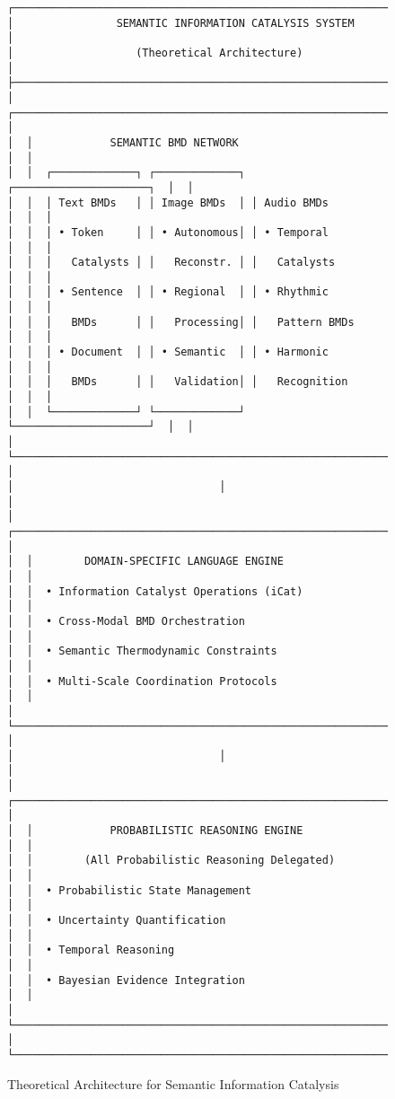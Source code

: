 \documentclass[12pt,a4paper,twoside]{article}
\begin{document}
\begin{figure}[h]
\centering
\begin{verbatim}
┌─────────────────────────────────────────────────────────────────┐
│                SEMANTIC INFORMATION CATALYSIS SYSTEM           │
│                   (Theoretical Architecture)                   │
├─────────────────────────────────────────────────────────────────┤
│  ┌───────────────────────────────────────────────────────────┐  │
│  │            SEMANTIC BMD NETWORK                           │  │
│  │  ┌─────────────┐ ┌─────────────┐ ┌─────────────────────┐  │  │
│  │  │ Text BMDs   │ │ Image BMDs  │ │ Audio BMDs          │  │  │
│  │  │ • Token     │ │ • Autonomous│ │ • Temporal          │  │  │
│  │  │   Catalysts │ │   Reconstr. │ │   Catalysts         │  │  │
│  │  │ • Sentence  │ │ • Regional  │ │ • Rhythmic          │  │  │
│  │  │   BMDs      │ │   Processing│ │   Pattern BMDs      │  │  │
│  │  │ • Document  │ │ • Semantic  │ │ • Harmonic          │  │  │
│  │  │   BMDs      │ │   Validation│ │   Recognition       │  │  │
│  │  └─────────────┘ └─────────────┘ └─────────────────────┘  │  │
│  └───────────────────────────────────────────────────────────┘  │
│                                │                                │
│  ┌───────────────────────────────────────────────────────────┐  │
│  │        DOMAIN-SPECIFIC LANGUAGE ENGINE                   │  │
│  │  • Information Catalyst Operations (iCat)                │  │
│  │  • Cross-Modal BMD Orchestration                          │  │
│  │  • Semantic Thermodynamic Constraints                    │  │
│  │  • Multi-Scale Coordination Protocols                    │  │
│  └───────────────────────────────────────────────────────────┘  │
│                                │                                │
│  ┌───────────────────────────────────────────────────────────┐  │
│  │            PROBABILISTIC REASONING ENGINE                 │  │
│  │        (All Probabilistic Reasoning Delegated)           │  │
│  │  • Probabilistic State Management                        │  │
│  │  • Uncertainty Quantification                            │  │
│  │  • Temporal Reasoning                                     │  │
│  │  • Bayesian Evidence Integration                         │  │
│  └───────────────────────────────────────────────────────────┘  │
└─────────────────────────────────────────────────────────────────┘
\end{verbatim}
\caption{Theoretical Architecture for Semantic Information Catalysis}
\end{figure}
\end{document}
